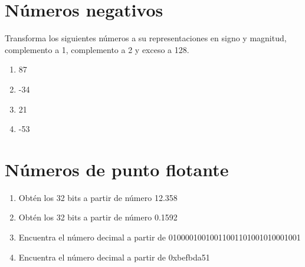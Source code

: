 \documentclass{article}
\begin{document}
    \section{Números negativos}
    Transforma los siguientes números a su representaciones en signo y magnitud,
    complemento a 1, complemento a 2 y exceso a 128.

    \begin{enumerate}
        \item {
            87
        }
        \item {
            -34
        }
        \item {
            21
        }
        \item {
            -53
        }
    \end{enumerate}

    \section{Números de punto flotante}
    \begin{enumerate}
        \item {
            Obtén los 32 bits a partir de número 12.358
        }
        \item {
            Obtén los 32 bits a partir de número 0.1592
        }
        \item {
            Encuentra el número decimal a partir de 
            01000010010011001101001010001001
        }
        \item {
            Encuentra el número decimal a partir de 0xbefbda51
        }
    \end{enumerate}
\end{document}
